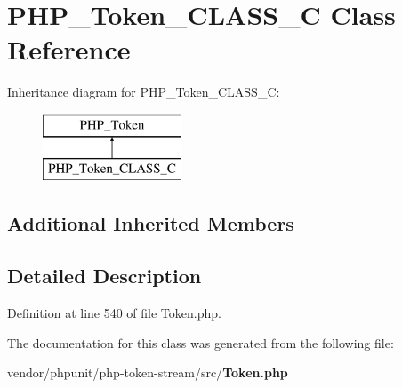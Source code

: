 \section{P\+H\+P\+\_\+\+Token\+\_\+\+C\+L\+A\+S\+S\+\_\+\+C Class Reference}
\label{class_p_h_p___token___c_l_a_s_s___c}
Inheritance diagram for P\+H\+P\+\_\+\+Token\+\_\+\+C\+L\+A\+S\+S\+\_\+\+C\+:\begin{figure}[H]
\begin{center}
\leavevmode
\includegraphics[height=2.000000cm]{class_p_h_p___token___c_l_a_s_s___c}
\end{center}
\end{figure}
\subsection*{Additional Inherited Members}


\subsection{Detailed Description}


Definition at line 540 of file Token.\+php.



The documentation for this class was generated from the following file\+:\begin{DoxyCompactItemize}
\item 
vendor/phpunit/php-\/token-\/stream/src/{\bf Token.\+php}\end{DoxyCompactItemize}
